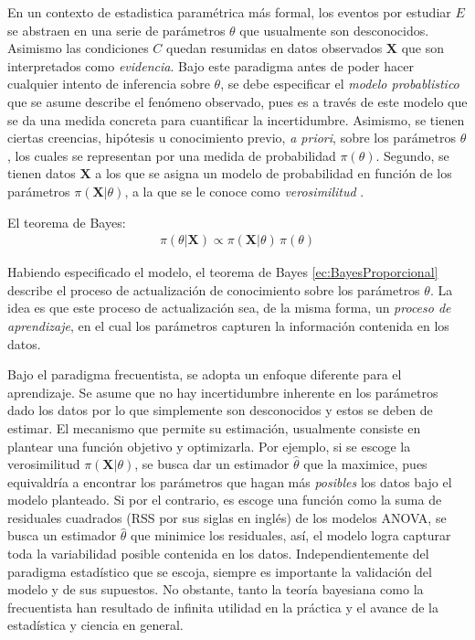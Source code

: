 \documentclass[../Main/Main.tex]{subfiles}
\begin{document}
En un contexto de estadistica paramétrica más formal, los eventos por estudiar $E$ se abstraen en una serie de parámetros $\theta$ que usualmente son desconocidos. Asimismo las condiciones $C$ quedan resumidas en datos observados $\mathbf{X}$ que son interpretados como \textit{evidencia}. 
Bajo este paradigma antes de poder hacer cualquier intento de inferencia sobre $\theta$, se debe especificar el \textit{modelo probablistico} que se asume describe el fenómeno observado, pues es a través de este modelo que se da una medida concreta para cuantificar la incertidumbre. Asimismo, se tienen ciertas creencias, hipótesis u conocimiento previo, \textit{a priori}, sobre los parámetros $\theta$, los cuales se representan por una medida de probabilidad $\pi(\theta)$. Segundo, se tienen datos $\mathbf{X}$ a los que se asigna un modelo de probabilidad en función de los parámetros $\pi(\mathbf{X}|\theta)$, a la que se le conoce como \textit{verosimilitud} \autocite{bernardo2003bayesian}.\\
\begin{theorem}
El teorema de Bayes:
\begin{align} 
	\pi(\theta|\mathbf{X}) \propto \pi(\mathbf{X}|\theta)\,\pi(\theta)\label{ec:BayesProporcional}
\end{align}
\end{theorem}
\vspace*{-.7cm}
Habiendo especificado el modelo, el teorema de Bayes \eqref{ec:BayesProporcional} describe el proceso de actualización de conocimiento sobre los parámetros $\theta$. La idea es que este proceso de actualización sea, de la misma forma, un \textit{proceso de aprendizaje}, en el cual los parámetros capturen la información contenida en los datos.

Bajo el paradigma frecuentista, se adopta un enfoque diferente para el  aprendizaje. Se asume que no hay incertidumbre inherente en los parámetros dado los datos por lo que simplemente son desconocidos y estos  se deben de estimar. El mecanismo que permite su estimación, usualmente consiste en plantear una función objetivo y optimizarla. Por ejemplo, si se escoge la verosimilitud $\pi(\mathbf{X}|\theta)$, se busca dar un estimador $\hat{\theta}$ que la maximice, pues equivaldría a encontrar los parámetros que hagan más \textit{posibles} los datos bajo el modelo planteado. Si por el contrario, es escoge una función como la suma de residuales cuadrados (RSS por sus siglas en inglés) de los modelos ANOVA, se busca un estimador $\hat{\theta}$ que minimice los residuales, así, el modelo logra capturar toda la variabilidad posible contenida en los datos. Independientemente del paradigma estadístico que se escoja, siempre es importante la validación del modelo y de sus supuestos. No obstante, tanto la teoría bayesiana como la frecuentista han resultado de infinita utilidad en la práctica y el avance de la estadística y ciencia en general.
\end{document}
